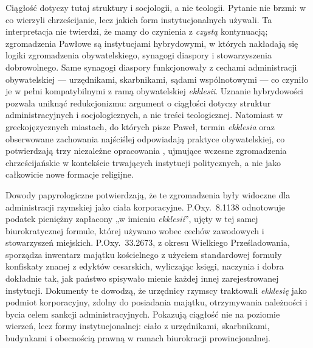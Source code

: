 Ciągłość dotyczy tutaj struktury i socjologii, a nie teologii.
Pytanie nie brzmi: w co wierzyli chrześcijanie, lecz jakich form instytucjonalnych używali.
Ta interpretacja nie twierdzi, że mamy do czynienia z \emph{czystą} kontynuacją; zgromadzenia Pawłowe są instytucjami hybrydowymi, w których nakładają się logiki zgromadzenia obywatelskiego, synagogi diaspory i stowarzyszenia dobrowolnego.
Same synagogi diaspory funkcjonowały z cechami administracji obywatelskiej — urzędnikami, skarbnikami, sądami wspólnotowymi — co czyniło je w pełni kompatybilnymi z ramą obywatelskiej \emph{ekklesii}.
Uznanie hybrydowości pozwala uniknąć redukcjonizmu: argument o ciągłości dotyczy struktur administracyjnych i socjologicznych, a nie treści teologicznej.
Natomiast w greckojęzycznych miastach, do których pisze Paweł, termin \emph{ekklesia} oraz obserwowane zachowania najściślej odpowiadają praktyce obywatelskiej, co potwierdzają trzy niezależne opracowania \cite{park:ekklesia,esler:galatians,vankooten:ekklesia}, ujmujące wczesne zgromadzenia chrześcijańskie w kontekście trwających instytucji politycznych, a nie jako całkowicie nowe formacje religijne.

Dowody papyrologiczne potwierdzają, że te zgromadzenia były widoczne dla administracji rzymskiej jako ciała korporacyjne.
P.Oxy.~8.1138 odnotowuje podatek pieniężny zapłacony „w imieniu \textit{ekklesii}”, ujęty w tej samej biurokratycznej formule, której używano wobec cechów zawodowych i stowarzyszeń miejskich.
P.Oxy.~33.2673, z okresu Wielkiego Prześladowania, sporządza inwentarz majątku kościelnego z użyciem standardowej formuły konfiskaty znanej z edyktów cesarskich, wyliczając księgi, naczynia i dobra dokładnie tak, jak państwo spisywało mienie każdej innej zarejestrowanej instytucji.
Dokumenty te dowodzą, że urzędnicy rzymscy traktowali \textit{ekklesię} jako podmiot korporacyjny, zdolny do posiadania majątku, otrzymywania należności i bycia celem sankcji administracyjnych.
Pokazują ciągłość nie na poziomie wierzeń, lecz formy instytucjonalnej: ciało z urzędnikami, skarbnikami, budynkami i obecnością prawną w ramach biurokracji prowincjonalnej.

